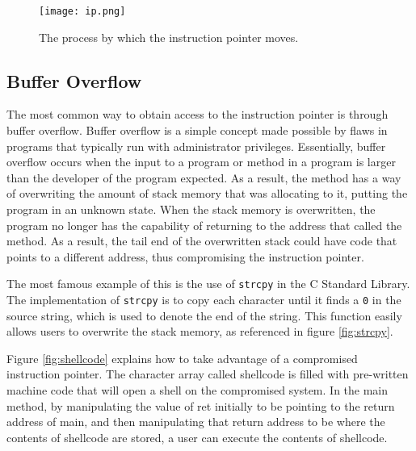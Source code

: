 \begin{figure}
\texttt{[image: ip.png]}
\caption{The process by which the instruction pointer moves.}
\label{fig:ip}
\end{figure}

\subsection{Buffer Overflow}

The most common way to obtain access to the instruction pointer is through buffer overflow. Buffer overflow is a simple concept made possible by flaws in programs that typically run with administrator privileges. Essentially, buffer overflow occurs when the input to a program or method in a program is larger than the developer of the program expected. As a result, the method has a way of overwriting the amount of stack memory that was allocating to it, putting the program in an unknown state. When the stack memory is overwritten, the program no longer has the capability of returning to the address that called the method. As a result, the tail end of the overwritten stack could have code that points to a different address, thus compromising the instruction pointer.

The most famous example of this is the use of \texttt{strcpy} in the C Standard Library. The implementation of \texttt{strcpy} is to copy each character until it finds a \texttt{0} in the source string, which is used to denote the end of the string. This function easily allows users to overwrite the stack memory, as referenced in figure \ref{fig:strcpy}. \cite{buffer_overflow_attack_2004}

Figure \ref{fig:shellcode} explains how to take advantage of a compromised instruction pointer. The character array called shellcode is filled with pre-written machine code that will open a shell on the compromised system. In the main method, by manipulating the value of ret initially to be pointing to the return address of main, and then manipulating that return address to be where the contents of shellcode are stored, a user can execute the contents of shellcode.

\newpage
\vfill

